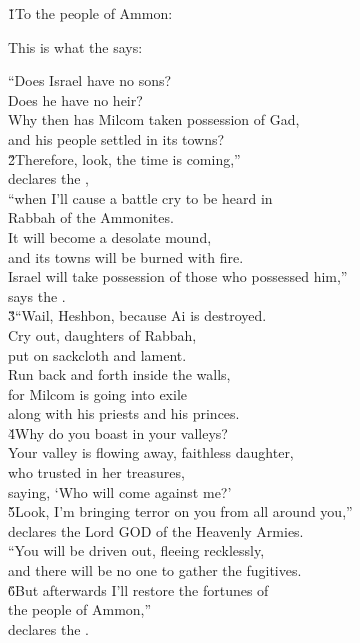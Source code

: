 \v{1}To the people of Ammon:

This is what the  says:

\begin{poetry}
\poeml ``Does Israel have no sons? \\
\poemll    Does he have no heir? \\
\poeml Why then has Milcom taken possession of Gad, \\
\poemll    and his people settled in its towns? \\
\poeml \v{2}Therefore, look, the time is coming,'' \\
\poemll    declares the , \\
\poeml ``when I'll cause a battle cry to be heard in \\
\poemll    Rabbah of the Ammonites. \\
\poeml It will become a desolate mound, \\
\poemll    and its towns will be burned with fire. \\
\poeml Israel will take possession of those who possessed him,'' \\
\poemll    says the . \\
\poeml \v{3}``Wail, Heshbon, because Ai is destroyed. \\
\poemll    Cry out, daughters of Rabbah, \\
\poemlll       put on sackcloth and lament. \\
\poeml Run back and forth inside the walls, \\
\poemll    for Milcom is going into exile \\
\poemlll       along with his priests and his princes. \\
\poeml \v{4}Why do you boast in your valleys? \\
\poeml Your valley is flowing away, faithless daughter, \\
\poemll    who trusted in her treasures, \\
\poemlll       saying, `Who will come against me?' \\
\poeml \v{5}Look, I'm bringing terror on you from all around you,'' \\
\poemll    declares the Lord GOD of the Heavenly Armies. \\
\poeml ``You will be driven out, fleeing recklessly, \\
\poemll    and there will be no one to gather the fugitives. \\
\poeml \v{6}But afterwards I'll restore the fortunes of \\
\poemll    the people of Ammon,'' \\
\poemlll       declares the .
\end{poetry}

